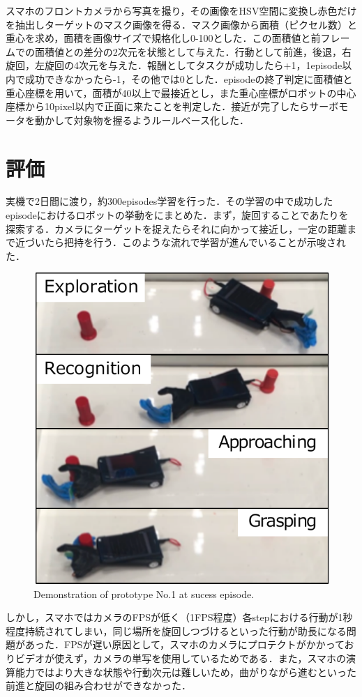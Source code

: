 スマホのフロントカメラから写真を撮り，その画像をHSV空間に変換し赤色だけを抽出しターゲットのマスク画像を得る．マスク画像から面積（ピクセル数）と重心を求め，面積を画像サイズで規格化し0-100とした．この面積値と前フレームでの面積値との差分の2次元を状態として与えた．行動として前進，後退，右旋回，左旋回の4次元を与えた．報酬としてタスクが成功したら+1，1episode以内で成功できなかったら-1，その他では0とした．episodeの終了判定に面積値と重心座標を用いて，面積が40以上で最接近とし，また重心座標がロボットの中心座標から10pixel以内で正面に来たことを判定した．接近が完了したらサーボモータを動かして対象物を握るようルールベース化した．


\section{評価}
実機で2日間に渡り，約300episodes学習を行った．その学習の中で成功したepisodeにおけるロボットの挙動をにまとめた．まず，旋回することであたりを探索する．カメラにターゲットを捉えたらそれに向かって接近し，一定の距離まで近づいたら把持を行う．このような流れで学習が進んでいることが示唆された．

\begin{figure}[H]
    \centering
    \includegraphics[width=0.7\linewidth]{figure/chapter3/robothand-v1_demo}
    \caption{Demonstration of prototype No.1 at sucess episode.}
    \label{fig:1号機例}
\end{figure}

しかし，スマホではカメラのFPSが低く（1FPS程度）各stepにおける行動が1秒程度持続されてしまい，同じ場所を旋回しつづけるといった行動が助長になる問題があった．FPSが遅い原因として，スマホのカメラにプロテクトがかかっておりビデオが使えず，カメラの単写を使用しているためである．また，スマホの演算能力ではより大きな状態や行動次元は難しいため，曲がりながら進むといった前進と旋回の組み合わせができなかった．


